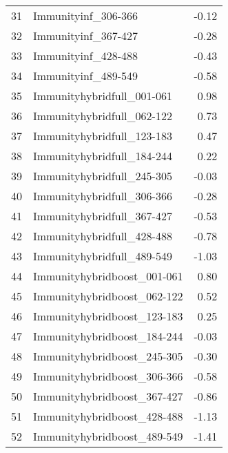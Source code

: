 \begin{table}[ht]
\begin{tabular}{rlr}
  31 & Immunityinf\_306-366 & -0.12 \\ 
  32 & Immunityinf\_367-427 & -0.28 \\ 
  33 & Immunityinf\_428-488 & -0.43 \\ 
  34 & Immunityinf\_489-549 & -0.58 \\ 
  35 & Immunityhybridfull\_001-061 & 0.98 \\ 
  36 & Immunityhybridfull\_062-122 & 0.73 \\ 
  37 & Immunityhybridfull\_123-183 & 0.47 \\ 
  38 & Immunityhybridfull\_184-244 & 0.22 \\ 
  39 & Immunityhybridfull\_245-305 & -0.03 \\ 
  40 & Immunityhybridfull\_306-366 & -0.28 \\ 
  41 & Immunityhybridfull\_367-427 & -0.53 \\ 
  42 & Immunityhybridfull\_428-488 & -0.78 \\ 
  43 & Immunityhybridfull\_489-549 & -1.03 \\ 
  44 & Immunityhybridboost\_001-061 & 0.80 \\ 
  45 & Immunityhybridboost\_062-122 & 0.52 \\ 
  46 & Immunityhybridboost\_123-183 & 0.25 \\ 
  47 & Immunityhybridboost\_184-244 & -0.03 \\ 
  48 & Immunityhybridboost\_245-305 & -0.30 \\ 
  49 & Immunityhybridboost\_306-366 & -0.58 \\ 
  50 & Immunityhybridboost\_367-427 & -0.86 \\ 
  51 & Immunityhybridboost\_428-488 & -1.13 \\ 
  52 & Immunityhybridboost\_489-549 & -1.41 \\ 
   \hline
\end{tabular}
\end{table}
